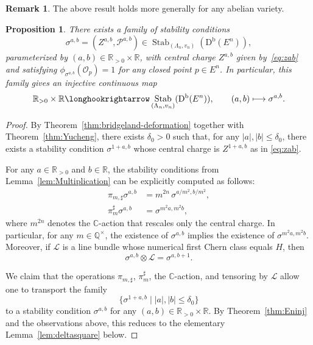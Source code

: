 \documentclass[11pt, reqno]{amsart}
\numberwithin{equation}{section}
\theoremstyle{plain}
\newtheorem{proposition}[theorem]{Proposition}
\theoremstyle{remark}
\theoremstyle{definition}
\newtheorem{remark}[theorem]{Remark}
\theoremstyle{italicsname}
\newcommand{\Db}{\mathrm{D^b}}
\DeclareMathOperator{\Stab}{Stab}
\newcommand{\cO}{\mathcal{O}}
\newcommand{\cL}{\mathcal{L}}
\newcommand{\cP}{\mathscr{P}}
\def\CC{\ensuremath{\mathbb{C}}}
\def\QQ{\ensuremath{\mathbb{Q}}}
\def\RR{\ensuremath{\mathbb{R}}}
\begin{document}
\begin{remark}
The above result holds more generally for any abelian variety.
\end{remark}

\begin{proposition}\label{prop:sigmaabRonEn}
There exists a family of stability conditions
\[
\sigma^{a,b}=(Z^{a,b},\cP^{a,b})\in\Stab_{(\Lambda_n,v_n)}(\Db(E^n)),
\]
parameterized by $(a,b)\in \RR_{>0}\times \RR$, with central charge $Z^{a,b}$
given by~\eqref{eq:zab} and satisfying $\phi_{\sigma^{a,b}}(\cO_p)=1$ for any closed point $p \in E^n$. In particular, this family gives an injective continuous map
\[
\RR_{>0}\times\RR\longhookrightarrow\Stab_{(\Lambda_n,v_n)}(\Db(E^n)),\qquad (a,b)\longmapsto\sigma^{a,b}.
\]
\end{proposition}

\begin{proof}
By Theorem~\ref{thm:bridgeland-deformation} together with Theorem~\ref{thm:Yucheng}, there exists
$\delta_0>0$ such that, for any $|a|,|b|\le \delta_0$, there exists a
stability condition $\sigma^{1+a,b}$ whose central charge is
$Z^{1+a,b}$ as in \eqref{eq:zab}.

For any $a\in \RR_{>0}$ and $b\in \RR$, the stability conditions from Lemma~\ref{lem:Multiplication} can be explicitly computed as follows: 
\begin{align}
\label{pim-pushforward-sigma} \pi_{m,\sharp}\sigma^{a,b} & = m^{2n}\,\sigma^{a/m^2,b/m^2}, \\
\label{pim-pullback-sigma} \pi_m^\sharp \sigma^{a,b} & = \sigma^{m^2a,m^2b},
\end{align}
where $m^{2n}$ denotes the $\CC$-action that rescales only the central charge.
In particular, for any $m\in \QQ^\times$, the existence of $\sigma^{a,b}$ implies the existence of $\sigma^{m^2a,m^2b}$.
Moreover, if $\cL$ is a line bundle whose numerical first Chern class
equals $H$, then
\begin{equation}
\label{sigmab-otimes-L}
\sigma^{a,b}\otimes \cL = \sigma^{a,b+1}.
\end{equation}

We claim that the operations $\pi_{m,\sharp}$, $\pi_m^\sharp$, the
$\CC$-action, and tensoring by $\cL$ allow one to transport the family
\begin{equation*}\label{eq:deltasquare}
\{\sigma^{1+a,b} \mid |a|,|b|\le \delta_0\}
\end{equation*}
to a stability condition $\sigma^{a,b}$ for any 
$(a,b)\in \RR_{>0}\times \RR$.
By Theorem~\ref{thm:Eninj} and the observations above, this reduces to the elementary Lemma~\ref{lem:deltasquare} below. 
\end{proof}
\end{document}
